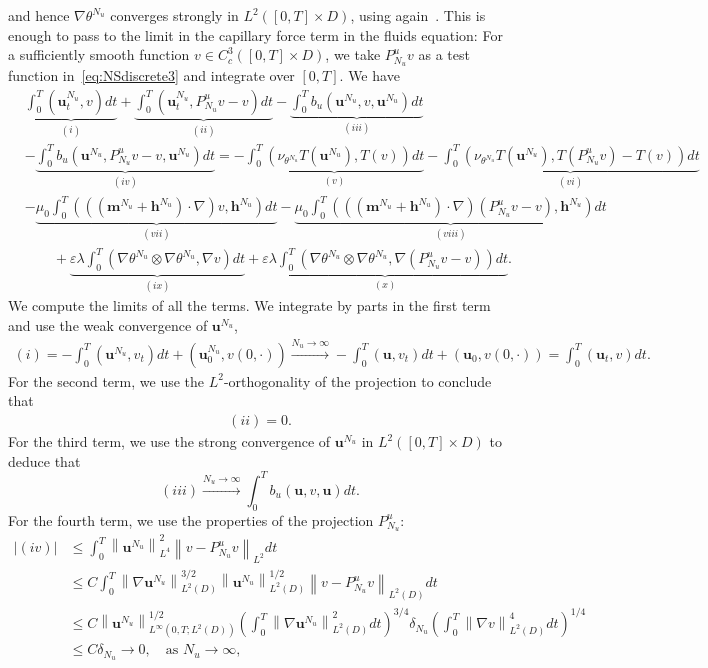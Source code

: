 \documentclass[10pt,letterpaper,twoside]{amsart}
\theoremstyle{definition}{\newtheorem{definition}[lemma]{Definition}}
\theoremstyle{note}{\newtheorem{claim}{Claim}[section]
\newtheorem*{claim*}{Claim}}
\numberwithin{equation}{section}
\newcommand{\dom}{D}
\newcommand{\norm}[1]{\left\| #1 \right\|}
\newcommand{\eps}{\varepsilon}
\newcommand{\Grad}{\nabla}
\newcommand{\bu}{\mathbf{u}}
\newcommand{\bm}{\mathbf{m}}
\newcommand{\thc}{\theta^{N_u}}
\newcommand{\bh}{\mathbf{h}}
\begin{document}
 and hence $\Grad\thc$ converges strongly in $L^2([0,T]\times\dom)$, using again~\cite[Theorem 1.1.1 (iii)]{Evans1990}. This is enough to pass to the limit in the capillary force term in the fluids equation:  For a sufficiently smooth function $v\in C^3_c([0,T]\times\dom)$, we take $P^u_{N_u}v$ as a test function in~\eqref{eq:NSdiscrete3} and integrate over $[0,T]$. We have
  \begin{align*}
 	&\underbrace{\int_0^T(\bu^{N_u}_t,v)dt}_{(i)} +\underbrace{\int_0^T(\bu^{N_u}_t,P^u_{N_u}v-v)dt}_{(ii)} -\underbrace{\int_0^T b_u(\bu^{N_u},v,\bu^{N_u})dt}_{(iii)} \\
 	&-\underbrace{\int_0^T b_u(\bu^{N_u},P^u_{N_u}v-v,\bu^{N_u})dt }_{(iv)} =-\underbrace{\int_0^T(\nu_{\theta^{N_u}} T(\bu^{N_u}), T( v))dt}_{(v)}-\underbrace{\int_0^T(\nu_{\theta^{N_u}} T(\bu^{N_u}),T( P^u_{N_u}v)-T( v))dt}_{(vi)}\\ &-\underbrace{\mu_0\int_0^T(((\bm^{N_u}+\bh^{N_u})\cdot\Grad)v,\bh^{N_u})dt}_{(vii)} -\underbrace{\mu_0\int_0^T(((\bm^{N_u}+\bh^{N_u})\cdot\Grad)(P^u_{N_u}v-v),\bh^{N_u})dt}_{(viii)}\\
 	&\qquad +\underbrace{\eps\lambda\int_0^T(\Grad\theta^{N_u}\otimes \Grad\theta^{N_u},\Grad v)dt}_{(ix)} +\underbrace{\eps\lambda\int_0^T(\Grad\theta^{N_u}\otimes \Grad\theta^{N_u},\Grad (P^u_{N_u}v-v))dt }_{(x)}.
 \end{align*}
 We compute the limits of all the terms. We integrate by parts in the first term and use the weak convergence of $\bu^{N_u}$, 
 \begin{align*}
 	(i) = -\int_0^T (\bu^{N_u},v_t) dt +(\bu^{N_u}_0,v(0,\cdot))\stackrel{N_u\to\infty}{\longrightarrow} -\int_0^T(\bu,v_t)dt +(\bu_0,v(0,\cdot)) = \int_0^T(\bu_t,v)dt.
 \end{align*}
 For the second term, we use the $L^2$-orthogonality of the projection to conclude that 
 \begin{align*}
 	(ii)=0.
 \end{align*}
 For the third term, we use the strong convergence of $\bu^{N_u}$ in $L^2([0,T]\times\dom)$ to deduce that
 \begin{equation*}
 	(iii)\stackrel{N_u\to \infty}{\longrightarrow} \int_0^T b_u(\bu,v,\bu) dt.
 \end{equation*}
 For the fourth term, we use the properties of the projection $P^u_{N_u}$:
 \begin{equation*}
 	\begin{split}
 		|(iv)|&\leq \int_0^T\norm{\bu^{N_u}}_{L^4}^2 \norm{v-P_{N_u}^u v}_{L^2} dt\\
 		& \leq C\int_0^T \norm{\Grad\bu^{N_u}}_{L^2(\dom)}^{3/2}\norm{\bu^{N_u}}_{L^2(\dom)}^{1/2} \norm{v-P_{N_u}^u v}_{L^2(\dom)}dt\\
 			& \leq C\norm{\bu^{N_u}}_{L^\infty(0,T;L^2(\dom))}^{1/2} \left(\int_0^T \norm{\Grad\bu^{N_u}}_{L^2(\dom)}^{2}dt\right)^{3/4}\delta_{N_u}\left(\int_0^T\norm{\Grad v}_{L^2(\dom)}^4 dt\right)^{1/4}\\
 			&\leq C \delta_{N_u}\longrightarrow 0,\quad \text{as } N_u\to \infty,
 	\end{split}
 	\end{equation*}
\end{document}
